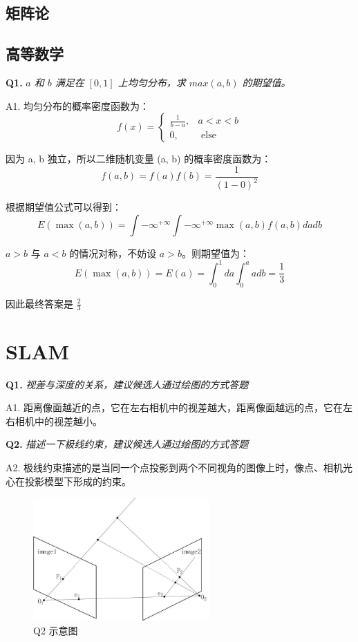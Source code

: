 \documentclass[cn,10pt,math=newtx,citestyle=gb7714-2015,bibstyle=gb7714-2015]{elegantbook}
\begin{document}
\subsection{矩阵论}

\subsection{高等数学}

\textbf{Q1.} \textit{$a$ 和 $b$ 满足在 $[0, 1]$ 上均匀分布，求 $max(a, b)$ 的期望值。}

A1. 均匀分布的概率密度函数为：
\begin{equation}
f(x)= \begin{cases}\frac{1}{b-a}, & a<x<b \\ 0, & \text { else }\end{cases}
\end{equation}

因为 a, b 独立，所以二维随机变量 (a, b) 的概率密度函数为：
\begin{equation}
f(a, b)=f(a) f(b)=\frac{1}{(1-0)^{2}}
\end{equation}

根据期望值公式可以得到：
\begin{equation}
E(\max (a, b))=\int-\infty^{+\infty} \int-\infty^{+\infty} \max (a, b) f(a, b) d a d b
\end{equation}

$a>b$ 与 $a<b$ 的情况对称，不妨设 $a>b$。则期望值为：
\begin{equation}
E(\max (a, b))=E(a)=\int_{0}^{1} d a \int_{0}^{a} a d b=\frac{1}{3}
\end{equation}

因此最终答案是 $\frac{2}{3}$


\newpage


\section{SLAM}

\textbf{Q1.} \textit{视差与深度的关系，建议候选人通过绘图的方式答题}

A1. 距离像面越近的点，它在左右相机中的视差越大，距离像面越远的点，它在左右相机中的视差越小。


\textbf{Q2.} \textit{描述一下极线约束，建议候选人通过绘图的方式答题}

A2. 极线约束描述的是当同一个点投影到两个不同视角的图像上时，像点、相机光心在投影模型下形成的约束。


\begin{figure}[ht]
  \centering
  \includegraphics[width=0.6\textwidth]{image/2.4.q2.jpeg}
  \caption{Q2 示意图}
\end{figure}
\end{document}
